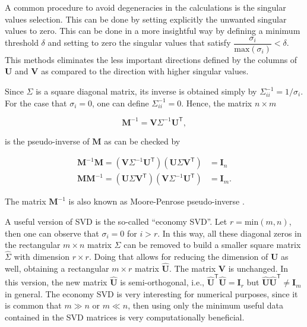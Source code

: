 A common procedure to avoid degeneracies in the calculations is the singular values selection. This can be done by setting explicitly the unwanted singular values to zero. This can be done in a more insightful way by defining a minimum threshold $\delta$ and setting to zero the singular values that satisfy $\dfrac{\sigma_i}{\mathrm{max}\left(\sigma_i\right)} < \delta$. This methods eliminates the less important directions defined by the columns of $\mathbf{U}$ and $\mathbf{V}$ as compared to the direction with higher singular values. 

Since $\Sigma$ is a square diagonal matrix, its inverse is obtained simply by $\Sigma^{-1}_{ii} = 1/\sigma_{i}$. For the case that $\sigma_{i} = 0$, one can define $\Sigma^{-1}_{ii} = 0$. Hence, the matrix $n \times m$

\begin{equation}
    \mathbf{M}^{-1} = \mathbf{V} \Sigma^{-1} \mathbf{U}^{\mathsf{T}},
    \label{eq:svd_inverse}
\end{equation}

is the pseudo-inverse of $\mathbf{M}$ as can be checked by

\begin{align}
    \mathbf{M}^{-1}\mathbf{M} =  \left(\mathbf{V} \Sigma^{-1} \mathbf{U}^{\mathsf{T}} \right)\left(\mathbf{U} \Sigma \mathbf{V}^{\mathsf{T}}\right) &= \mathbf{I}_{n} \\
    \mathbf{M}\mathbf{M}^{-1} =  \left(\mathbf{U} \Sigma \mathbf{V}^{\mathsf{T}}\right)\left( \mathbf{V} \Sigma^{-1} \mathbf{U}^{\mathsf{T}} \right)&= \mathbf{I}_{m}. 
\end{align}

The matrix $\mathbf{M}^{-1}$ is also known as Moore-Penrose pseudo-inverse \cite{numerical_recipes}.

A useful version of SVD is the so-called ``economy SVD''. Let $r = \mathrm{min}\left(m, n\right)$, then one can observe that $\sigma_i = 0$ for $i > r$. In this way, all these diagonal zeros in the rectangular $m \times n$ matrix $\Sigma$ can be removed to build a smaller square matrix $\hat{\Sigma}$ with dimension $r \times r$. Doing that allows for reducing the dimension of $\mathbf{U}$ as well, obtaining a rectangular $m \times r$ matrix $\hat{\mathbf{U}}$. The matrix $\mathbf{V}$ is unchanged. In this version, the new matrix $\hat{\mathbf{U}}$ is semi-orthogonal, i.e., $\hat{\mathbf{U}}^{\mathsf{T}}\hat{\mathbf{U}} = \mathbf{I}_r$ but $\hat{\mathbf{U}}\hat{\mathbf{U}}^{\mathsf{T}} \neq \mathbf{I}_m$ in general. The economy SVD is very interesting for numerical purposes, since it is common that $m \gg n$ or $m \ll n$, then using only the minimum useful data contained in the SVD matrices is very computationally beneficial.

